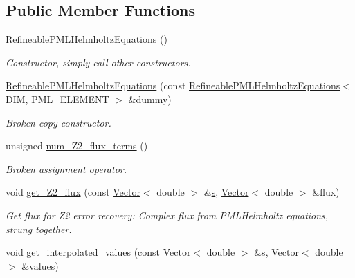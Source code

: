 \subsection*{Public Member Functions}
\begin{DoxyCompactItemize}
\item 
\hyperlink{classoomph_1_1RefineablePMLHelmholtzEquations_a1a2fe7b1a39e8f6a46d23f1924295804}{Refineable\+P\+M\+L\+Helmholtz\+Equations} ()
\begin{DoxyCompactList}\small\item\em Constructor, simply call other constructors. \end{DoxyCompactList}\item 
\hyperlink{classoomph_1_1RefineablePMLHelmholtzEquations_a3ee7236f173edb1144cf75fd9f12e7b8}{Refineable\+P\+M\+L\+Helmholtz\+Equations} (const \hyperlink{classoomph_1_1RefineablePMLHelmholtzEquations}{Refineable\+P\+M\+L\+Helmholtz\+Equations}$<$ D\+IM, P\+M\+L\+\_\+\+E\+L\+E\+M\+E\+NT $>$ \&dummy)
\begin{DoxyCompactList}\small\item\em Broken copy constructor. \end{DoxyCompactList}\item 
unsigned \hyperlink{classoomph_1_1RefineablePMLHelmholtzEquations_ace2458391996badfd1c2ef8664a3bc27}{num\+\_\+\+Z2\+\_\+flux\+\_\+terms} ()
\begin{DoxyCompactList}\small\item\em Broken assignment operator. \end{DoxyCompactList}\item 
void \hyperlink{classoomph_1_1RefineablePMLHelmholtzEquations_ad51cfaf01ba8ca49842796d3f906877c}{get\+\_\+\+Z2\+\_\+flux} (const \hyperlink{classoomph_1_1Vector}{Vector}$<$ double $>$ \&\hyperlink{cfortran_8h_ab7123126e4885ef647dd9c6e3807a21c}{s}, \hyperlink{classoomph_1_1Vector}{Vector}$<$ double $>$ \&flux)
\begin{DoxyCompactList}\small\item\em Get \textquotesingle{}flux\textquotesingle{} for Z2 error recovery\+: Complex flux from P\+M\+L\+Helmholtz equations, strung together. \end{DoxyCompactList}\item 
void \hyperlink{classoomph_1_1RefineablePMLHelmholtzEquations_a19a3644f2c65eba0f55a81f63f54ddf5}{get\+\_\+interpolated\+\_\+values} (const \hyperlink{classoomph_1_1Vector}{Vector}$<$ double $>$ \&\hyperlink{cfortran_8h_ab7123126e4885ef647dd9c6e3807a21c}{s}, \hyperlink{classoomph_1_1Vector}{Vector}$<$ double $>$ \&values)

\end{DoxyCompactItemize}
